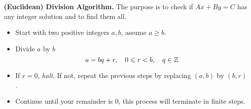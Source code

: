{\bf \large (Euclidean) Division Algorithm.}
The purpose is to check if $Ax + By = C$ has any integer solution and to find them all.
\begin{itemize}
\item Start with two positive integers $a,b$, assume $a \geq b$.
\item Divide $a$ by $b$
\[a = bq + r,\quad 0 \leqslant r < b,\quad q \in \mathbb Z\]
\item If $r = 0$, \textsl{halt}. If not, repeat the previous steps by replacing $(a,b)$ by $(b,r)$.
\item Continue until your remainder is $0$, this process will terminate in finite steps.
\end{itemize}

\vspace*{1em}

